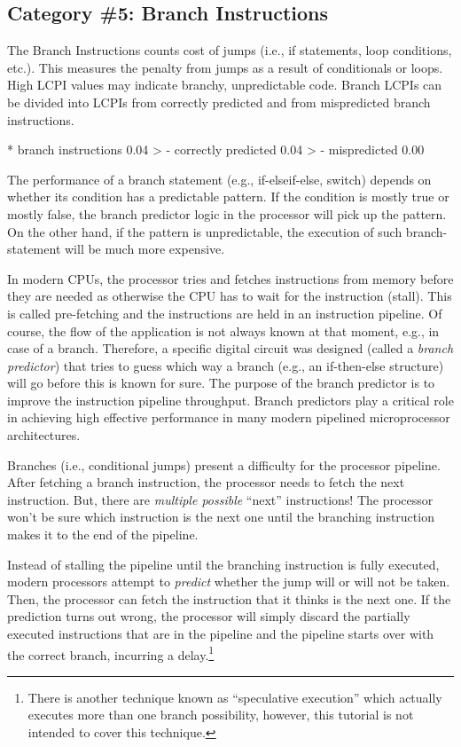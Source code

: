 \subsection{Category \#5: Branch Instructions}
\label{subsec:CAT5_Branch_Instructions}

The Branch Instructions counts cost of jumps (i.e., if statements, loop conditions, etc.). This measures the penalty from jumps as a result of conditionals or loops. High LCPI values may indicate branchy, unpredictable code. Branch LCPIs can be divided into LCPIs from correctly predicted and from mispredicted branch instructions.

\begin{prompt}
* branch instructions   0.04 >
 - correctly predicted  0.04 >
 - mispredicted         0.00
\end{prompt}

The performance of a branch statement (e.g., if-elseif-else, switch) depends on whether its condition has a predictable pattern. If the condition is mostly true or mostly false, the branch predictor logic in the processor will pick up the pattern. On the other hand, if the pattern is unpredictable, the execution of such branch-statement will be much more expensive.

In modern CPUs, the processor tries and fetches instructions from memory before they are needed as otherwise the CPU has to wait for the instruction (stall). This is called pre-fetching and the instructions are held in an instruction pipeline. Of course, the flow of the application is not always known at that moment, e.g., in case of a branch. Therefore, a specific digital circuit was designed (called a \emph{branch predictor}) that tries to guess which way a branch (e.g., an if-then-else structure) will go before this is known for sure. The purpose of the branch predictor is to improve the instruction pipeline throughput. Branch predictors play a critical role in achieving high effective performance in many modern pipelined microprocessor architectures.

Branches (i.e., conditional jumps) present a difficulty for the processor pipeline. After fetching a branch instruction, the processor needs to fetch the next instruction. But, there are \emph{multiple possible} ``next'' instructions! The processor won't be sure which instruction is the next one until the branching instruction makes it to the end of the pipeline.

Instead of stalling the pipeline until the branching instruction is fully executed, modern processors attempt to \emph{predict} whether the jump will or will not be taken. Then, the processor can fetch the instruction that it thinks is the next one. If the prediction turns out wrong, the processor will simply discard the partially executed instructions that are in the pipeline and the pipeline starts over with the correct branch,
incurring a delay.\footnote{There is another technique known as ``speculative execution'' which actually executes more than one branch possibility, however, this tutorial is not intended to cover this technique.}

